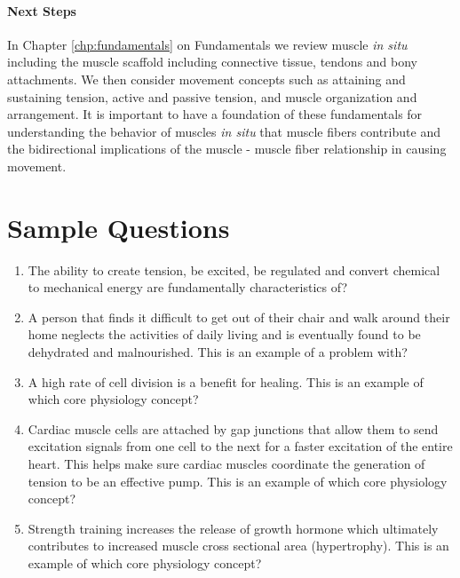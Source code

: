\paragraph{Next Steps}
In Chapter \ref{chp:fundamentals} on Fundamentals we review muscle \textit{in situ} including the muscle scaffold including connective tissue, tendons and bony attachments. We then consider movement concepts such as attaining and sustaining tension, active and passive tension, and muscle organization and arrangement. It is important to have a foundation of these fundamentals for understanding the behavior of muscles \textit{in situ} that muscle fibers contribute and the bidirectional implications of the muscle - muscle fiber relationship in causing movement.

\printbibliography[heading=subbibintoc]

\section*{Sample Questions}

\begin{enumerate}
    \item The ability to create tension, be excited, be regulated and convert chemical to mechanical energy are fundamentally characteristics of?
    \item A person that finds it difficult to get out of their chair and walk around their home neglects the activities of daily living and is eventually found to be dehydrated and malnourished. This is an example of a problem with?
    \item A high rate of cell division is a benefit for healing. This is an example of which core physiology concept?
    \item Cardiac muscle cells are attached by gap junctions that allow them to send excitation signals from one cell to the next for a faster excitation of the entire heart. This helps make sure cardiac muscles coordinate the generation of tension to be an effective pump. This is an example of which core physiology concept?
    \item Strength training increases the release of growth hormone which ultimately contributes to increased muscle cross sectional area (hypertrophy). This is an example of which core physiology concept?
\end{enumerate} 